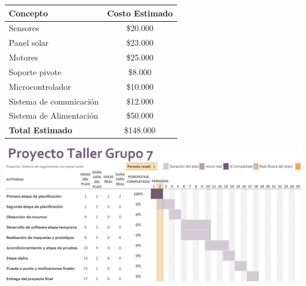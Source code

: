 \documentclass[a4paper,12pt]{article}
\begin{document}
\begin{table}[h!]
        \centering
        \begin{tabular}{|l|c|}
            \hline
            Concepto  & Costo Estimado \\ 
            \hline
            Sensores & \$20.000 \\
            Panel solar  & \$23.000 \\
            Motores  & \$25.000 \\
            Soporte pivote & \$8.000 \\
            Microcontrolador  & \$10.000 \\
            Sistema de comunicación  & \$12.000 \\
            Sistema de Alimentación  & \$50.000 \\
            \hline
            \textbf{Total Estimado} & \$148.000 \\
            \hline
        \end{tabular}
        \label{tabla}
        \end{table}

\newpage
\begin{landscape}
    \thispagestyle{empty} %
    \begin{center}
        \includegraphics[width=0.95\linewidth]{grantt-V3.png}
        \label{cronograma}
    \end{center}
\end{landscape}
\end{document}
